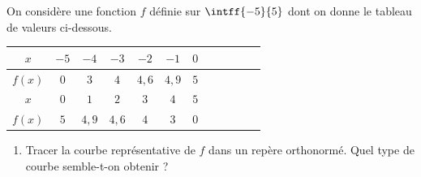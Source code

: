 \begin{exo}{}
	On considère une fonction $f$ définie sur $\intff{-5}{5}$ dont on donne le tableau de valeurs ci-dessous.


	\begin{center}
		\renewcommand{\arraystretch}{1.5}
		\begin{tabular}{|c|c|c|c|c|c|c|c|c|c|c|c|} \hline
			\cellcolor{gray!30}$x$    & $-5$ & $-4$  & $-3$  & $-2$  & $-1$  & $0$ \\ \hline
			\cellcolor{gray!30}$f(x)$ & $0$  & $3$   & $4$   & $4,6$ & $4,9$ & $5$ \\ \hline\hline
			\cellcolor{gray!30}$x$    & $0$  & $1$   & $2$   & $3$   & $4$   & $5$ \\ \hline
			\cellcolor{gray!30}$f(x)$ & $5$  & $4,9$ & $4,6$ & $4$   & $3$   & $0$ \\ \hline
		\end{tabular}
	\end{center}
	\begin{enumerate}
		\item Tracer la courbe représentative de $f$ dans un repère orthonormé. Quel type de courbe semble-t-on obtenir ?
	\end{enumerate}
\end{exo}
